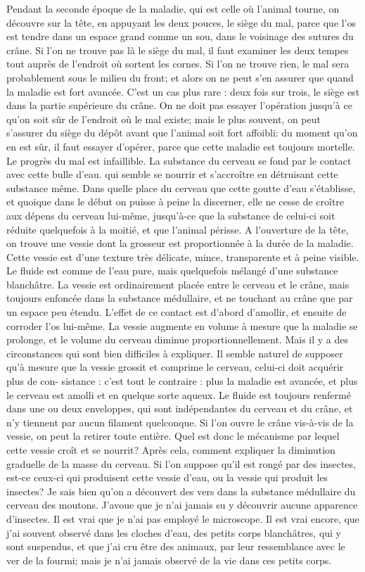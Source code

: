 Pendant la seconde époque de la maladie, qui est celle où l'animal tourne, on découvre sur la tête, en appuyant les deux pouces, le siège du mal, parce que l'os est tendre dans un espace grand comme un sou, dans le voisinage des sutures du crâne. Si l'on ne trouve pas là le siège du mal, il faut examiner les deux tempes tout auprès de l'endroit où sortent les cornes. Si l'on ne trouve rien, le mal sera probablement sous le milieu du front; et alors on ne peut s'en assurer que quand la maladie est fort avancée. C'est un cas plus rare : deux fois sur trois, le siège est dans la partie supérieure du crâne.
On ne doit pas essayer l'opération jusqu'à ce qu'on soit sûr de l'endroit où le mal existe; mais le plus souvent, on peut s'assurer du siège du dépôt avant que l'animal soit fort affoibli: du moment qu'on en est sûr, il faut essayer d'opérer, parce que cette maladie est toujours mortelle. Le progrès du mal est infaillible. La substance du cerveau se fond par le contact avec cette bulle d'eau.\setcounter{page}{248} qui semble se nourrir et s’accroître en détruisant cette substance même. Dans quelle place du cerveau que cette goutte d’eau s’établisse, et quoique dans le début on puisse à peine la discerner, elle ne cesse de croître aux dépens du cerveau lui-même, jusqu’à-ce que la substance de celui-ci soit réduite quelquefois à la moitié, et que l’animal périsse.
A l’ouverture de la tête, on trouve une vessie dont la grosseur est proportionnée à la durée de la maladie. Cette vessie est d’une texture très délicate, mince, transparente et à peine visible. Le fluide est comme de l’eau pure, mais quelquefois mélangé d’une substance blanchâtre. La vessie est ordinairement placée entre le cerveau et le crâne, mais toujours enfoncée dans la substance médullaire, et ne touchant au crâne que par un espace peu étendu. L’effet de ce contact est d’abord d’amollir, et ensuite de corroder l’os lui-même. La vessie augmente en volume à mesure que la maladie se prolonge, et le volume du cerveau diminue proportionnellement. Mais il y a des circonstances qui sont bien difficiles à expliquer.
Il semble naturel de supposer qu’à mesure que la vessie grossit et comprime le cerveau, celui-ci doit acquérir plus de con-\setcounter{page}{249} sistance : c'est tout le contraire : plus la maladie est avancée, et plus le cerveau est amolli et en quelque sorte aqueux. Le fluide est toujours renfermé dans une ou deux enveloppes, qui sont indépendantes du cerveau et du crâne, et n'y tiennent par aucun filament quelconque. Si l'on ouvre le crâne vis-à-vis de la vessie, on peut la retirer toute entière. Quel est donc le mécanisme par lequel cette vessie croît et se nourrit? Après cela, comment expliquer la diminution graduelle de la masse du cerveau. Si l'on suppose qu'il est rongé par des insectes, est-ce ceux-ci qui produisent cette vessie d'eau, ou la vessie qui produit les insectes? Je sais bien qu'on a découvert des vers dans la substance médullaire du cerveau des moutons. J'avoue que je n'ai jamais su y découvrir aucune apparence d'insectes. Il est vrai que je n'ai pas employé le microscope. Il est vrai encore, que j'ai souvent observé dans les cloches d'eau, des petits corps blanchâtres, qui y sont suspendus, et que j'ai cru être des animaux, par leur ressemblance avec le ver de la fourmi; mais je n'ai jamais observé de la vie dans ces petits corps.
